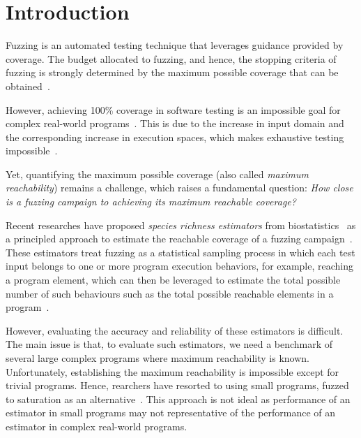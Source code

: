 \documentclass[conference]{IEEEtran}
\begin{document}
\section{Introduction}
Fuzzing is an automated testing technique that leverages guidance provided
by coverage. The budget allocated to fuzzing, and hence, the stopping criteria
of fuzzing is strongly determined by the maximum possible coverage that can
be obtained~\cite{fell2017review}.

However, achieving 100\% coverage in software testing is an impossible goal for
complex real-world programs~\cite{horgan1994achieving}.
This is due to the increase in input domain and the corresponding
increase in execution spaces, which makes exhaustive testing
impossible~\cite{knight1996exhaustive}.

Yet, quantifying the maximum possible coverage (also called \emph{maximum reachability})
remains a challenge, which raises a fundamental question:
\emph{How close is a fuzzing campaign to achieving its maximum reachable coverage?}

Recent researches have proposed \emph{species richness estimators} from
biostatistics~\cite{chao2016species} as a principled approach to estimate
the reachable coverage of a fuzzing campaign~\cite{stads}.
These estimators treat fuzzing as a statistical sampling process in which
each test input belongs to one or more program execution behaviors,
for example, reaching a program element, which can then be leveraged to
estimate the total possible number of such behaviours such as the total
possible reachable elements in a program~\cite{stads}.


However, evaluating the accuracy and reliability
of these estimators is difficult. The main issue is that, to evaluate such
estimators, we need a benchmark of several large complex programs where
maximum reachability is known. Unfortunately, establishing the maximum
reachability is impossible except for trivial programs. Hence,
rearchers have resorted to using small
programs, fuzzed to saturation as an alternative~\cite{reachability_2023}.
This approach is not ideal as performance of an estimator in small
programs may not representative of the performance of an estimator in complex
real-world programs.
\end{document}

